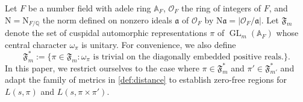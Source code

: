 \documentclass[12pt,reqno]{amsart}
\renewcommand{\tilde}{\widetilde}
\theoremstyle{remark}
\renewcommand{\tilde}{\widetilde}
\DeclareMathOperator{\GL}{GL}
\renewcommand{\tilde}{\widetilde}
\newcommand{\N}{\mathrm{N}}
\newcommand{\Q}{\mathbb{Q}}
\newcommand{\ka}{\mathfrak{a}}
\newcommand{\cO}{\mathcal{O}}
\numberwithin{equation}{section}
\begin{document}
    Let $F$ be a number field with adele ring $\mathbb{A}_F$,
    $\cO_F$ the ring of integers of $F$, and $\N=\N_{F/\Q}$ the norm defined on nonzero ideals $\ka$ of $\cO_F$ by $\N\ka=|\cO_F/\ka|$.
    Let $\mathfrak{F}_{m}$ denote the set of cuspidal automorphic representations $\pi$ of $\GL_{m}(\mathbb{A}_F)$ whose central character $\omega_{\pi}$ is unitary.   %
    For convenience, we also define 
    \begin{equation}\label{def:f*}
        \mathfrak{F}_{m}^* := \{\pi \in \mathfrak{F}_m: \omega_{\pi} \text{ is trivial on the diagonally embedded positive reals.}\}.
    \end{equation} 
    In this paper, we restrict ourselves to the case where $\pi \in \mathfrak{F}_{m}^*$ and $\pi' \in \mathfrak{F}_{m'}^*$ and adapt the family of metrics in \eqref{def:distance} to establish zero-free regions for $L(s,\pi)$ and $L(s,\pi\times\pi')$. 

    
	 
	

    
\end{document}
